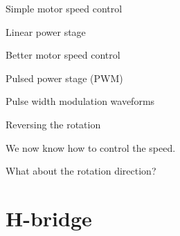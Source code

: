 \documentclass[compress]{beamer}
\begin{document}
{
    \begin{frame}{Simple motor speed control}
    \end{frame}
}

{
    \begin{frame}{Linear power stage}
    \end{frame}
}

{
    \begin{frame}{Better motor speed control}
    \end{frame}
}

{
    \begin{frame}{Pulsed power stage (PWM)}
    \end{frame}
}

{
    \begin{frame}{Pulse width modulation waveforms}
    \end{frame}
}



\begin{frame}{Reversing the rotation}

    We now know how to control the speed.

    What about the rotation direction?
\end{frame}

\section{H-bridge}
\end{document}
